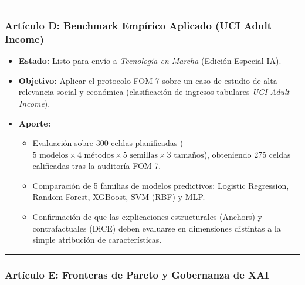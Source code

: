 \documentclass[
]{article}
\providecommand{\tightlist}{%
  \setlength{\itemsep}{0pt}\setlength{\parskip}{0pt}}
\begin{document}
\begin{center}\rule{0.5\linewidth}{0.5pt}\end{center}

\subsubsection{Artículo D: Benchmark Empírico Aplicado (UCI Adult
Income)}\label{artuxedculo-d-benchmark-empuxedrico-aplicado-uci-adult-income}

\begin{itemize}
\tightlist
\item
  \textbf{Estado:} Listo para envío a \emph{Tecnología en Marcha}
  (Edición Especial IA).
\item
  \textbf{Objetivo:} Aplicar el protocolo FOM-7 sobre un caso de estudio
  de alta relevancia social y económica (clasificación de ingresos
  tabulares \emph{UCI Adult Income}).
\item
  \textbf{Aporte:}

  \begin{itemize}
  \tightlist
  \item
    Evaluación sobre 300 celdas planificadas
    (\(5 \text{ modelos} \times 4 \text{ métodos} \times 5 \text{ semillas} \times 3 \text{ tamaños}\)),
    obteniendo 275 celdas calificadas tras la auditoría FOM-7.
  \item
    Comparación de 5 familias de modelos predictivos: Logistic
    Regression, Random Forest, XGBoost, SVM (RBF) y MLP.
  \item
    Confirmación de que las explicaciones estructurales (Anchors) y
    contrafactuales (DiCE) deben evaluarse en dimensiones distintas a la
    simple atribución de características.
  \end{itemize}
\end{itemize}

\begin{center}\rule{0.5\linewidth}{0.5pt}\end{center}

\subsubsection{Artículo E: Fronteras de Pareto y Gobernanza de
XAI}\label{artuxedculo-e-fronteras-de-pareto-y-gobernanza-de-xai}
\end{document}
